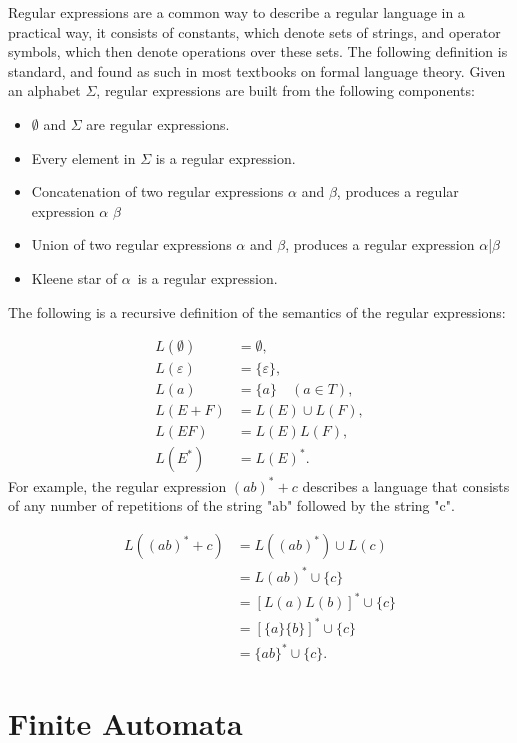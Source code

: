Regular expressions are a common way to describe a regular language in a practical way, 
it consists of constants, which denote sets of strings, and operator symbols, which then denote operations over these sets. 
The following definition is standard, and found as such in most textbooks on formal language theory.
Given an alphabet \( \Sigma \), regular expressions are built from the following components:
\begin{itemize}
    \item \(\emptyset\) and \( \Sigma \) are regular expressions.
    \item Every element in \( \Sigma \) is a regular expression.
    \item Concatenation of two regular expressions \(\alpha\) and \(\beta\), produces a regular expression \(\alpha\) \(\beta\)
    \item Union of two regular expressions \(\alpha\) and \(\beta\), produces a regular expression \(\alpha\)|\(\beta\)
    \item Kleene star of \(\alpha\)\ is a regular expression.
\end{itemize}
The following is a recursive definition of the semantics of the regular
expressions:

\begin{align*}
L(\emptyset) &= \emptyset, \\
L(\varepsilon) &= \{\varepsilon\}, \\
L(a) &= \{a\} \quad (a \in T), \\
L(E + F) &= L(E) \cup L(F), \\
L(EF) &= L(E)L(F), \\
L(E^*) &= L(E)^*.
\end{align*}
For example, the regular expression \( (ab)^* + c \) describes a language that consists of any number of repetitions of the string "ab" followed by the string "c".

\begin{align*}
L((ab)^* + c) &= L((ab)^*) \cup L(c) \\
              &= L(ab)^* \cup \{c\} \\
              &= [L(a)L(b)]^* \cup \{c\} \\
              &= [\{a\}\{b\}]^* \cup \{c\} \\
              &= \{ab\}^* \cup \{c\}.
\end{align*}

\section{Finite Automata}

